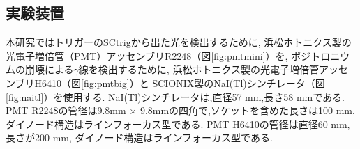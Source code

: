 \subsection{実験装置}

本研究ではトリガーのSCtrigから出た光を検出するために,
浜松ホトニクス製の光電子増倍管（PMT）アッセンブリR2248（図\ref{fig:pmtmini}）を,
ポジトロニウムの崩壊による$\gamma$線を検出するために,
浜松ホトニクス製の光電子増倍管アッセンブリH6410（図\ref{fig:pmtbig}）と
SCIONIX製のNaI(Tl)シンチレータ（図\ref{fig:naitl}）を使用する.
NaI(Tl)シンチレータは,直径57 mm,長さ58 mmである.
PMT R2248の管径は9.8mm $\times$ 9.8mmの四角で,ソケットを含めた長さは100 mm,
ダイノード構造はラインフォーカス型である.
PMT H6410の管径は直径60 mm,長さが200 mm,
ダイノード構造はラインフォーカス型である.

